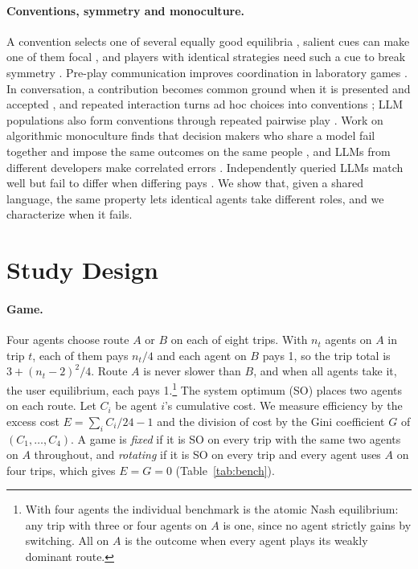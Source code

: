 \documentclass[11pt]{article}
\begin{document}
\paragraph{Conventions, symmetry and monoculture.}
A convention selects one of several equally good equilibria \citep{lewis1969_convention}, salient cues can make one of them focal \citep{schelling1960_strategy}, and players with identical strategies need such a cue to break symmetry \citep{crawford1990_learning}. Pre-play communication improves coordination in laboratory games \citep{cooper1992_communication,crawford1998_survey}. In conversation, a contribution becomes common ground when it is presented and accepted \citep{clark1986_referring,clark1996_using}, and repeated interaction turns ad hoc choices into conventions \citep{hawkins2020_reference_games}; LLM populations also form conventions through repeated pairwise play \citep{ashery2025_conventions}. Work on algorithmic monoculture finds that decision makers who share a model fail together \citep{kleinberg2021_monoculture} and impose the same outcomes on the same people \citep{bommasani2022_picking}, and LLMs from different developers make correlated errors \citep{kim2025_correlated}. Independently queried LLMs match well but fail to differ when differing pays \citep{ballestero2026_monoculture}. We show that, given a shared language, the same property lets identical agents take different roles, and we characterize when it fails.

\section{Study Design}
\label{sec:design}
\paragraph{Game.}
Four agents choose route $A$ or $B$ on each of eight trips. With $n_t$ agents on $A$ in trip $t$, each of them pays $n_t/4$ and each agent on $B$ pays 1, so the trip total is $3+(n_t-2)^2/4$. Route $A$ is never slower than $B$, and when all agents take it, the user equilibrium, each pays 1.\footnote{With four agents the individual benchmark is the atomic Nash equilibrium: any trip with three or four agents on $A$ is one, since no agent strictly gains by switching. All on $A$ is the outcome when every agent plays its weakly dominant route.} The system optimum (SO) places two agents on each route. Let $C_i$ be agent $i$'s cumulative cost. We measure efficiency by the excess cost $E=\sum_i C_i/24-1$ and the division of cost by the Gini coefficient $G$ of $(C_1,\dots,C_4)$. A game is \emph{fixed} if it is SO on every trip with the same two agents on $A$ throughout, and \emph{rotating} if it is SO on every trip and every agent uses $A$ on four trips, which gives $E=G=0$ (Table~\ref{tab:bench}).
\end{document}
